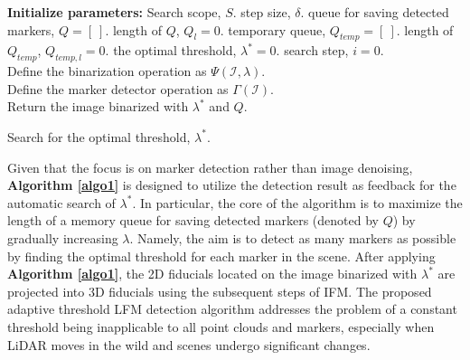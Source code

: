 \begin{algorithm}[th]
    
    \textbf{Initialize parameters:} Search scope, $S$. step size, $\delta$. 
    queue for saving detected markers, $Q=[ \ ]$. length of $Q$, $Q_l=0$.
    temporary queue, $Q_{temp}=[\ ]$. length of  $Q_{temp}$,  $Q_{temp,l}=0$. the optimal threshold, $\lambda^{*}=0$. search step, $i=0$.\\
    Define the binarization operation as $\Psi(\mathcal{I},\lambda)$. \\ Define the marker detector operation as $\Gamma(\mathcal{I})$. \\
    Return the image binarized with $\lambda^{*}$ and $Q$.
    \caption{ Search for the optimal threshold, $\lambda^{*}$. } \label{algo1}
\end{algorithm}
Given that the focus is on marker detection rather than image denoising, \textbf{Algorithm \ref{algo1}} is designed to utilize the detection result as feedback for the automatic search of $\lambda^{*}$.
%
In particular, the core of the algorithm is to maximize the length of a memory queue for saving detected markers (denoted by $Q$) by gradually increasing $\lambda$.
%
Namely, the aim is to detect as many markers as possible by finding the optimal threshold for each marker in the scene.
%
After applying \textbf{Algorithm \ref{algo1}}, the 2D fiducials located on the image binarized with $\lambda^{*}$ are projected into 3D fiducials using the subsequent steps of IFM. The proposed adaptive threshold LFM detection algorithm addresses the problem of a constant threshold being inapplicable to all point clouds and markers, especially when LiDAR moves in the wild and scenes undergo significant changes.
